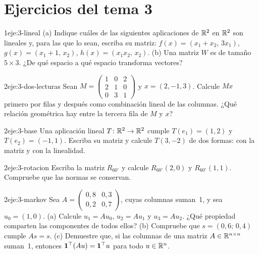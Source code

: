 \section*{Ejercicios del tema 3}

\begin{ejercicio}{1}{eje:3-lineal}
(a) Indique cuáles de las siguientes aplicaciones de $\mathbb{R}^{2}$ en $\mathbb{R}^{2}$ son lineales y, para las que lo sean, escriba su matriz: $f(x)=(x_1+x_2,\,3x_1)$, $g(x)=(x_1+1,\,x_2)$, $h(x)=(x_1x_2,\,x_2)$. (b) Una matriz $W$ es de tamaño $5\times 3$. ¿De qué espacio a qué espacio transforma vectores?
\end{ejercicio}

\begin{ejercicio}{2}{eje:3-dos-lecturas}
Sean $M=\begin{pmatrix}1&0&2\\2&1&0\\0&3&1\end{pmatrix}$ y $x=(2,-1,3)$. Calcule $Mx$ primero por filas y después como combinación lineal de las columnas. ¿Qué relación geométrica hay entre la tercera fila de $M$ y $x$?
\end{ejercicio}

\begin{ejercicio}{2}{eje:3-base}
Una aplicación lineal $T\colon\mathbb{R}^{2}\to\mathbb{R}^{2}$ cumple $T(e_1)=(1,2)$ y $T(e_2)=(-1,1)$. Escriba su matriz y calcule $T(3,-2)$ de dos formas: con la matriz y con la linealidad.
\end{ejercicio}

\begin{ejercicio}{2}{eje:3-rotacion}
Escriba la matriz $R_{60^\circ}$ y calcule $R_{60^\circ}(2,0)$ y $R_{60^\circ}(1,1)$. Compruebe que las normas se conservan.
\end{ejercicio}

\begin{ejercicio}{2}{eje:3-markov}
Sea $A=\begin{pmatrix}0{,}8&0{,}3\\0{,}2&0{,}7\end{pmatrix}$, cuyas columnas suman~1, y sea $u_0=(1,0)$. (a) Calcule $u_1=Au_0$, $u_2=Au_1$ y $u_3=Au_2$. ¿Qué propiedad comparten las componentes de todos ellos? (b) Compruebe que $s=(0{,}6;\,0{,}4)$ cumple $As=s$. (c) Demuestre que, si las columnas de una matriz $A\in\mathbb{R}^{n\times n}$ suman~1, entonces $\mathbf{1}^{\top}(Au)=\mathbf{1}^{\top}u$ para todo $u\in\mathbb{R}^{n}$.
\end{ejercicio}

